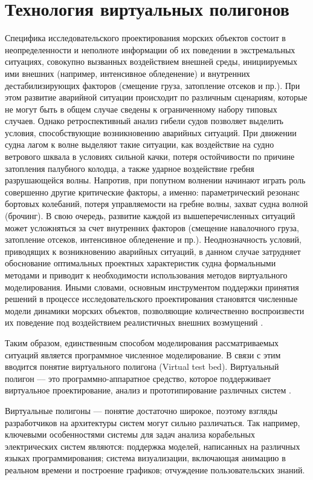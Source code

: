\section{Технология виртуальных полигонов}
\label{ch1_1_1}

Специфика исследовательского проектирования морских объектов состоит в неопределенности и неполноте информации об их поведении в экстремальных ситуациях, совокупно вызванных воздействием внешней среды, инициируемых ими внешних (например, интенсивное обледенение) и внутренних дестабилизирующих факторов (смещение груза, затопление отсеков и пр.). При этом развитие аварийной ситуации происходит по различным сценариям, которые не могут быть в общем случае сведены к ограниченному набору типовых случаев. Однако ретроспективный анализ гибели судов позволяет выделить условия, способствующие возникновению аварийных ситуаций. При движении судна лагом к волне выделяют такие ситуации, как воздействие на судно ветрового шквала в условиях сильной качки, потеря остойчивости по причине затопления палубного колодца, а также ударное воздействие гребня разрушающейся волны. Напротив, при попутном волнении начинают играть роль совершенно другие критические факторы, а именно: параметрический резонанс бортовых колебаний, потеря управляемости на гребне волны, захват судна волной (брочинг). В свою очередь, развитие каждой из вышеперечисленных ситуаций может усложняться за счет внутренних факторов (смещение навалочного груза, затопление отсеков, интенсивное обледенение и пр.). Неоднозначность условий, приводящих к возникновению аварийных ситуаций, в данном случае затрудняет обоснование оптимальных проектных характеристик судна формальными методами и приводит к необходимости использования методов виртуального моделирования. Иными словами, основным инструментом поддержки принятия решений в процессе исследовательского проектирования становятся численные модели динамики морских объектов, позволяющие количественно воспроизвести их поведение под воздействием реалистичных внешних возмущений \citep{nechaev_ai}.

Таким образом, единственным способом моделирования рассматриваемых ситуаций является программное численное моделирование. В связи с этим вводится понятие виртуального полигона (Virtual test bed).
Виртуальный полигон --– это программно-аппаратное средство, которое поддерживает виртуальное проектирование, анализ и прототипирование различных систем \citep{vtb_ship_ee} \citep{vtb_ILRO}. 

Виртуальные полигоны --- понятие достаточно широкое, поэтому взгляды разработчиков на архитектуры систем могут сильно различаться. Так например, ключевыми особенностями системы для задач анализа корабельных электрических систем \citep{vtb_ship_ee} являются: поддержка моделей, написанных на различных языках программирования; система визуализации, включающая анимацию в реальном времени и построение графиков; отчуждение пользовательских знаний.

